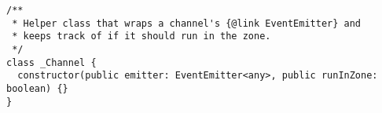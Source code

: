 \begin{verbatim}
/**
 * Helper class that wraps a channel's {@link EventEmitter} and
 * keeps track of if it should run in the zone.
 */
class _Channel {
  constructor(public emitter: EventEmitter<any>, public runInZone: boolean) {}
}
\end{verbatim}
